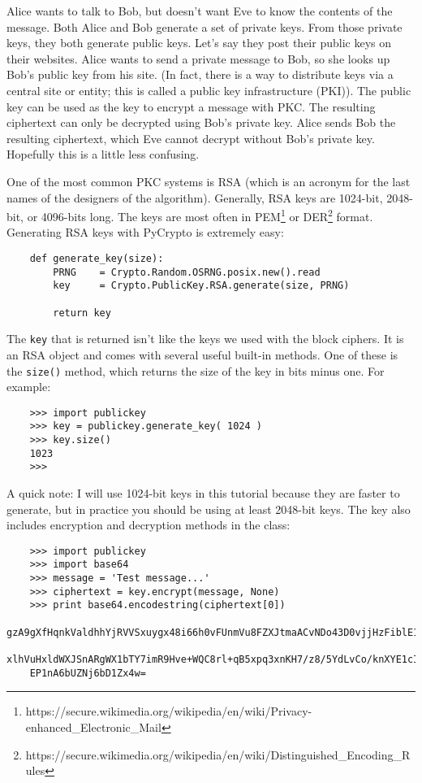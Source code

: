 \documentclass[letterpaper,10pt]{article}
\begin{document}
Alice wants to talk to Bob, but doesn't want Eve to know the contents of the
message. Both Alice and Bob generate a set of private keys. From those private
keys, they both generate public keys. Let's say they post their public keys on
their websites. Alice wants to send a private message to Bob, so she looks up
Bob's public key from his site. (In fact, there is a way to distribute keys via
a central site or entity; this is called a public key infrastructure (PKI)). The 
public key can be used as the key to encrypt a message with PKC. The resulting 
ciphertext can only be decrypted using Bob's private key. Alice sends Bob the 
resulting ciphertext, which Eve cannot decrypt without Bob's private key. 
Hopefully this is a little less confusing. 

One of the most common PKC systems is RSA (which is an acronym for the last 
names of the designers of the algorithm). Generally, RSA keys are 1024-bit,
2048-bit, or 4096-bits long. The keys are most often in 
PEM\footnote{https://secure.wikimedia.org/wikipedia/en/wiki/Privacy-enhanced\_Electronic\_Mail} 
or 
DER\footnote{https://secure.wikimedia.org/wikipedia/en/wiki/Distinguished\_Encoding\_Rules}
format. Generating RSA keys with PyCrypto is extremely easy:
\begin{verbatim}
    def generate_key(size):
        PRNG    = Crypto.Random.OSRNG.posix.new().read
        key     = Crypto.PublicKey.RSA.generate(size, PRNG)

        return key
\end{verbatim}

The \texttt{key} that is returned isn't like the keys we used with the block ciphers.
It is an RSA object and comes with several useful built-in methods. One of 
these is the \texttt{size()} method, which returns the size of the key in bits minus
one. For example:
\begin{verbatim}
    >>> import publickey
    >>> key = publickey.generate_key( 1024 )
    >>> key.size()
    1023
    >>>
\end{verbatim}

A quick note: I will use 1024-bit keys in this tutorial because they are 
faster to generate, but in practice you should be using at least 2048-bit 
keys. The key also includes encryption and decryption methods in the class:
\begin{verbatim}    
    >>> import publickey
    >>> import base64
    >>> message = 'Test message...'
    >>> ciphertext = key.encrypt(message, None)
    >>> print base64.encodestring(ciphertext[0])
    gzA9gXfHqnkValdhhYjRVVSxuygx48i66h0vFUnmVu8FZXJtmaACvNDo43D0vjjHzFiblE1eCFiI
    xlhVuHxldWXJSnARgWX1bTY7imR9Hve+WQC8rl+qB5xpq3xnKH7/z8/5YdLvCo/knXYE1cI/XYJP
    EP1nA6bUZNj6bD1Zx4w=
\end{verbatim}
\end{document}
